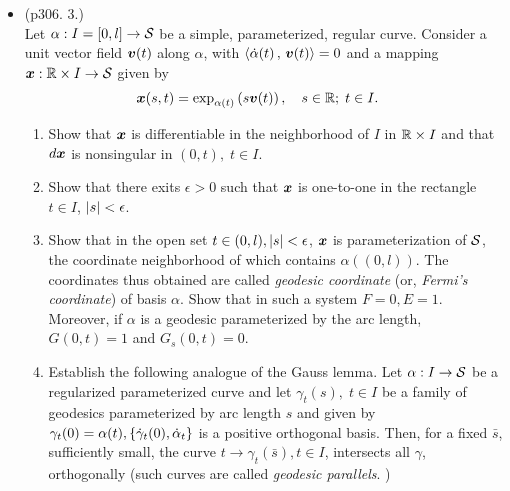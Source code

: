 \documentclass[11pt]{article}
\begin{document}
\begin{itemize}
\newpage
\item \begin{example}\citep{do1976differential} (p306. 3.)\\
Let $\alpha: I=[0,l]\rightarrow {\mathcal S}$ be a simple, parameterized, regular curve. Consider a unit vector field $\boldsymbol{v}(t)$ along $\alpha$, with $\left\langle \dot{\alpha}(t)\,,\, \boldsymbol{v}(t) \right\rangle=0$ and a mapping $\boldsymbol{x}: {\mathbb R}\times I \rightarrow {\mathcal S}$ given by 
\begin{align*}
\boldsymbol{x}(s,t) &= \exp_{\alpha(t)}\left(s\boldsymbol{v}(t)\right), \quad s\in {\mathbb R};\; t\in I.
\end{align*}
\begin{enumerate}
\item Show that $\boldsymbol{x}$ is differentiable in the neighborhood of $I$ in ${\mathbb R}\times I$ and that $d\boldsymbol{x}$ is nonsingular in $(0,t),\;t\in I$.
\item Show that there exits $\epsilon>0$ such that $\boldsymbol{x}$ is one-to-one in the rectangle $t\in I$, $\left\lvert s \right\rvert<\epsilon$.
\item Show that in the open set $t\in (0,l), \left\lvert s \right\rvert<\epsilon$, $\boldsymbol{x}$ is parameterization of ${\mathcal S}$, the coordinate neighborhood of which contains $\alpha((0,l))$. The coordinates thus obtained are called \emph{geodesic coordinate} (or, \emph{Fermi's coordinate}) of basis $\alpha$. Show that in such a system $F=0, E=1$. Moreover, if $\alpha$ is a geodesic parameterized by the arc length,  $G(0,t) = 1$ and $G_{s}(0,t) = 0$.
\item Establish the following analogue of the Gauss lemma. Let $\alpha: I\rightarrow {\mathcal S}$ be a regularized parameterized curve and let $\gamma_{t}(s),\;t\in I$ be a family of geodesics parameterized by arc length $s$ and given by $\gamma_{t}(0)=\alpha(t), \left\{\dot{\gamma}_{t}(0), \dot{\alpha}_{t}\right\}$ is a positive orthogonal basis. Then, for a fixed $\bar{s}$, sufficiently small, the curve $t\rightarrow \gamma_{t}(\bar{s}), t\in I$, intersects all $\gamma$, orthogonally (such curves are called \emph{geodesic parallels}. )
\end{enumerate}
\end{example}

\end{itemize}
\newpage


\end{document}
